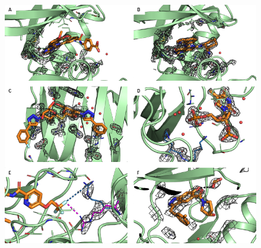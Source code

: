 \documentclass[9pt,bestpractices]{livecoms}
\begin{document}
\begin{figure}
    \centering
    \includegraphics[width=\textwidth]{figures/crystal/crystal1.png}
    {
        \label{fig:4pv0}
        \label{fig:4px6}
        \label{fig:5e89}
        \label{fig:1snc}
        \label{fig:3zov}
        \label{fig:5hnb}
    }
    
    

\end{figure}
\end{document}
